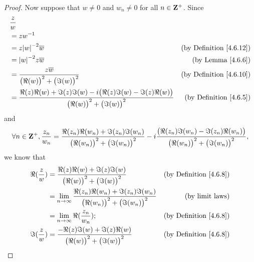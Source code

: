 \begin{proof}
    Now suppose that \(w \neq 0\) and \(w_n \neq 0\) for all \(n \in \mathbf{Z}^+\).
    Since
    \begin{align*}
         & \frac{z}{w}                                                                                                                                                       \\
         & = z w^{-1}                                                                                                                                                        \\
         & = z \abs{w}^{-2} \overline{w}                                                                                               & \text{(by Definition \ref{4.6.12})} \\
         & = \abs{w}^{-2} z \overline{w}                                                                                               & \text{(by Lemma \ref{4.6.6})}       \\
         & = \frac{z \overline{w}}{\big(\Re(w)\big)^2 + \big(\Im(w)\big)^2}                                                            & \text{(by Definition \ref{4.6.10})} \\
         & = \frac{\Re(z) \Re(w) + \Im(z) \Im(w) - i \big(\Re(z) \Im(w) - \Im(z) \Re(w)\big)}{\big(\Re(w)\big)^2 + \big(\Im(w)\big)^2} & \text{(by Definition \ref{4.6.5})}
    \end{align*}
    and
    \[
        \forall n \in \mathbf{Z}^+, \frac{z_n}{w_n} = \frac{\Re(z_n) \Re(w_n) + \Im(z_n) \Im(w_n)}{\big(\Re(w_n)\big)^2 + \big(\Im(w_n)\big)^2} - i \frac{\big(\Re(z_n) \Im(w_n) - \Im(z_n) \Re(w_n)\big)}{\big(\Re(w_n)\big)^2 + \big(\Im(w_n)\big)^2},
    \]
    we know that
    \begin{align*}
        \Re(\frac{z}{w}) & = \frac{\Re(z) \Re(w) + \Im(z) \Im(w)}{\big(\Re(w)\big)^2 + \big(\Im(w)\big)^2}                                   & \text{(by Definition \ref{4.6.8})} \\
                         & = \lim_{n \to \infty} \frac{\Re(z_n) \Re(w_n) + \Im(z_n) \Im(w_n)}{\big(\Re(w_n)\big)^2 + \big(\Im(w_n)\big)^2}   & \text{(by limit laws)}             \\
                         & = \lim_{n \to \infty} \Re(\frac{z_n}{w_n});                                                                       & \text{(by Definition \ref{4.6.8})} \\
        \Im(\frac{z}{w}) & = \frac{- \Re(z) \Im(w) + \Im(z) \Re(w)}{\big(\Re(w)\big)^2 + \big(\Im(w)\big)^2}                                 & \text{(by Definition \ref{4.6.8})} \\

\end{align*}
\end{proof}
